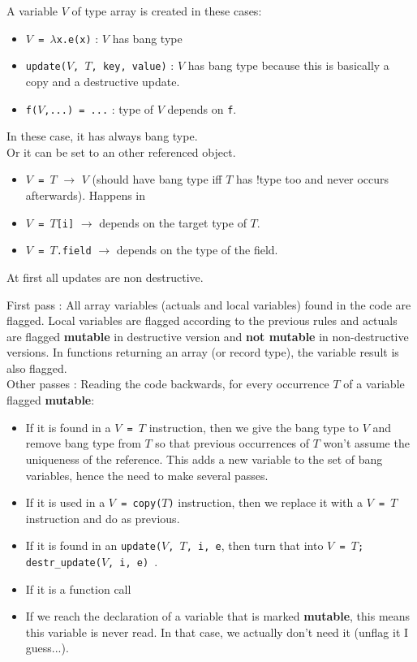 \documentclass[12pt,a4paper]{article}
\newcommand{\cl}[1]{\texttt{#1}}
\begin{document}
A variable $V$ of type array is created in these cases:
\begin{itemize}
\item \cl{$V$ = $\lambda$x.e(x)} : $V$ has bang type
\item \cl{update($V$, $T$, key, value)} : $V$ has bang type because this is basically a copy and a destructive update.
\item \cl{f($V$,...) = ...} : type of $V$ depends on \cl{f}.
\end{itemize}
In these case, it has always bang type.\\
Or it can be set to an other referenced object.
\begin{itemize}
\item \cl{$V$ = $T$} $\rightarrow$ $V$ (should have bang type iff $T$ has !type too and never occurs afterwards). Happens in 
\item \cl{$V$ = $T$[i]} $\rightarrow$ depends on the target type of $T$.
\item \cl{$V$ = $T$.field} $\rightarrow$ depends on the type of the field.
\end{itemize}
At first all updates are non destructive.

First pass : All array variables (actuals and local variables) found in the code are flagged. Local variables are flagged according to the previous rules and actuals are flagged \textbf{mutable} in destructive version and \textbf{not mutable} in non-destructive versions. In functions returning an array (or record type), the variable result is also flagged.\\

Other passes :
Reading the code backwards, for every occurrence $T$ of a variable flagged \textbf{mutable}:
\begin{itemize}
\item If it is found in a \cl{$V$ = $T$} instruction, then we give the bang type to $V$ and remove bang type from $T$ so that previous occurrences of $T$ won't assume the uniqueness of the reference. This adds a new variable to the set of bang variables, hence the need to make several passes.
\item If it is used in a \cl{$V$ = copy($T$)} instruction, then we replace it with a \cl{$V$ = $T$} instruction and do as previous.
\item If it is found in an \cl{update($V$, $T$, i, e}, then turn that into \cl{$V$ = $T$; destr\_update($V$, i, e) }.
\item If it is a function call 
\item If we reach the declaration of a variable that is marked \textbf{mutable}, this means this variable is never read. In that case, we actually don't need it (unflag it I guess...).
\end{itemize}
\end{document}
